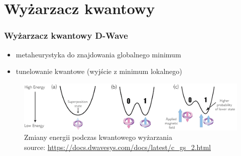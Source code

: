 \section{Wyżarzacz kwantowy}
\begin{frame}
\frametitle{Wyżarzacz kwantowy D-Wave
 }


\begin{itemize}
\item metaheurystyka do znajdowania globalnego minimum 
\item tunelowanie kwantowe (wyjście z minimum lokalnego)
\end{itemize}

\begin{figure}
\includegraphics[scale=0.4]{img/18/gorki.png}
\caption{Zmiany energii podczas kwantowego wyżarzania\\source: \url{https://docs.dwavesys.com/docs/latest/c_gs_2.html}}
\end{figure}

\end{frame}
